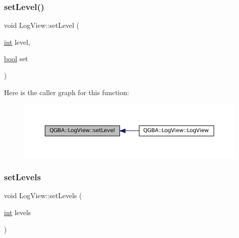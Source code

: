 \subsubsection{\texorpdfstring{set\+Level()}{setLevel()}}
{\footnotesize\ttfamily void Log\+View\+::set\+Level (\begin{DoxyParamCaption}\item[{\mbox{\hyperlink{ioapi_8h_a787fa3cf048117ba7123753c1e74fcd6}{int}}}]{level,  }\item[{\mbox{\hyperlink{libretro_8h_a4a26dcae73fb7e1528214a068aca317e}{bool}}}]{set }\end{DoxyParamCaption})\hspace{0.3cm}{\ttfamily [private]}}

Here is the caller graph for this function\+:
\nopagebreak
\begin{figure}[H]
\begin{center}
\leavevmode
\includegraphics[width=350pt]{class_q_g_b_a_1_1_log_view_a7c661fd0b6316bc62f71df6c39a1a715_icgraph}
\end{center}
\end{figure}
\mbox{\label{class_q_g_b_a_1_1_log_view_a813aa9ea6e209b95f0b467610b528e08}} 
\subsubsection{\texorpdfstring{set\+Levels}{setLevels}}
{\footnotesize\ttfamily void Log\+View\+::set\+Levels (\begin{DoxyParamCaption}\item[{\mbox{\hyperlink{ioapi_8h_a787fa3cf048117ba7123753c1e74fcd6}{int}}}]{levels }\end{DoxyParamCaption})\hspace{0.3cm}{\ttfamily [slot]}}


